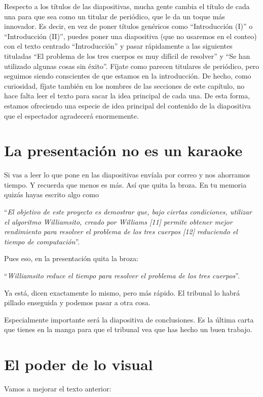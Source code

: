 Respecto a los títulos de las diapositivas, mucha gente cambia el título de cada una para que sea como un titular de periódico, que le da un toque más innovador.  Es decir, en vez de poner títulos genéricos como ``Introducción (I)'' o ``Introducción (II)'', puedes poner una diapositiva (que no usaremos en el conteo) con el texto centrado ``Introducción'' y pasar rápidamente a las siguientes tituladas ``El problema de los tres cuerpos es muy difícil de resolver'' y ``Se han utilizado algunas cosas sin éxito''. Fíjate como parecen titulares de periódico, pero seguimos siendo conscientes de que estamos en la introducción. De hecho, como curiosidad, fíjate también en los nombres de las secciones de este capítulo, no hace falta leer el texto para sacar la idea principal de cada una. De esta forma, estamos ofreciendo una especie de idea principal del contenido de la diapositiva que el espectador agradecerá enormemente.

\section{La presentación no es un karaoke}

Si vas a leer lo que pone en las diapositivas envíala por correo y nos ahorramos tiempo. Y recuerda que menos es más. Así que quita la broza. En tu memoria quizás hayas escrito algo como 

``\textit{El objetivo de este proyecto es demostrar que, bajo ciertas condiciones, utilizar el algoritmo Williamsito, creado por Williams [11] permite obtener mejor rendimiento para resolver el problema de los tres cuerpos [12] reduciendo el tiempo de computación}''. 

Pues eso, en la presentación quita la broza: 

``\textit{Williamsito reduce el tiempo para resolver el problema de los tres cuerpos}''. 

Ya está, dicen exactamente lo mismo, pero más rápido. El tribunal lo habrá pillado enseguida y podemos pasar a otra cosa.

Especialmente importante será la diapositiva de conclusiones. Es la última carta que tienes en la manga para que el tribunal vea que has hecho un buen trabajo.

\section{El poder de lo visual}
Vamos a mejorar el texto anterior: 

